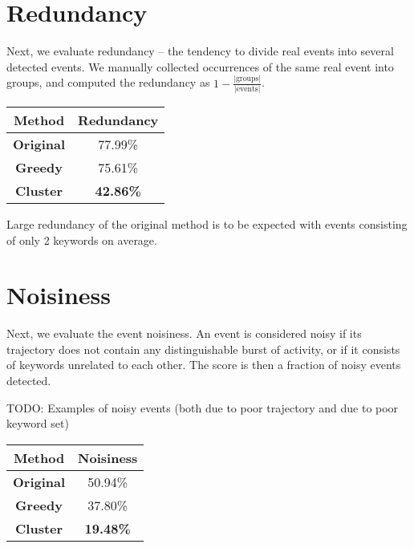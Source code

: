 \section{Redundancy}

Next, we evaluate redundancy -- the tendency to divide real events into several detected events. We manually collected occurrences of the same real event into groups, and computed the redundancy as $1 - \frac{\left| \text{groups} \right|}{\left| \text{events} \right|}$.

\hspace{\fill}

\begin{minipage}{\linewidth}
\centering
\begin{tabular}{ c c }\toprule[1.5pt]
\bf Method 	 & \bf Redundancy \\ \midrule
\bf Original &  77.99\% \\
\bf Greedy   &  75.61\% \\
\bf Cluster &  \bf 42.86\% \\ \bottomrule[1.25pt]
\end {tabular}\par
{} \label{tab:title} 
\end{minipage}

\hspace{\fill}

Large redundancy of the original method is to be expected with events consisting of only 2 keywords on average.

\section{Noisiness}

Next, we evaluate the event noisiness. An event is considered noisy if its trajectory does not contain any distinguishable burst of activity, or if it consists of keywords unrelated to each other. The score is then a fraction of noisy events detected.

{\color{red} TODO: Examples of noisy events (both due to poor trajectory and due to poor keyword set)}

\hspace{\fill}

\begin{minipage}{\linewidth}
\centering
\begin{tabular}{ c c }\toprule[1.5pt]
\bf Method 	 & \bf Noisiness \\ \midrule
\bf Original &  50.94\% \\
\bf Greedy   &  37.80\% \\
\bf Cluster &  \bf 19.48\% \\ \bottomrule[1.25pt]
\end {tabular}\par
{} \label{tab:title} 
\end{minipage}

